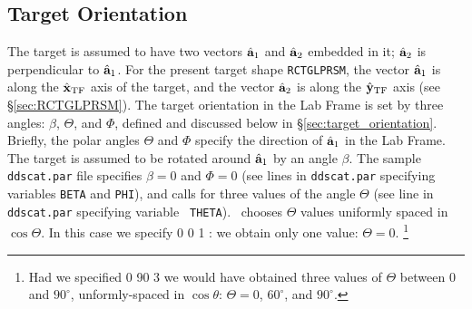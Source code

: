 

\subsection{\label{sec:target_orientation}
            Target Orientation}
The target is assumed to have two vectors ${\hat{\bf a}}_1$ and
${\hat{\bf a}}_2$ embedded in it; ${\hat{\bf a}}_2$ is perpendicular
to ${\hat{\bf a}}_1$.  
For the present target shape {\tt RCTGLPRSM},
the vector ${\hat{\bf
a}}_1$ is along the $\hat{\bf x}_{\rm TF}$ axis of the target, and the vector
${\hat{\bf a}}_2$ is along the $\hat{\bf y}_{\rm TF}$ axis (see \S\ref{sec:RCTGLPRSM}).
The target orientation in the Lab Frame is set by three angles: $\beta$,
$\Theta$, and $\Phi$, defined and discussed below in
\S\ref{sec:target_orientation}.  
Briefly, the polar angles $\Theta$
and $\Phi$ specify the direction of ${\hat{\bf a}}_1$ in the Lab
Frame.  The target is assumed to be rotated around ${\hat{\bf a}}_1$
by an angle $\beta$.  The sample {\tt ddscat.par} file specifies
$\beta=0$ and $\Phi=0$ (see lines in {\tt ddscat.par} specifying
variables {\tt BETA} and {\tt PHI}), and calls for three values of the
angle $\Theta$ (see line in {\tt ddscat.par} specifying variable {\tt
THETA}).  \ddscat\ chooses $\Theta$ values uniformly spaced
in $\cos\Theta$.  In this case we specify 0 0 1 : we obtain
only one value: $\Theta=0$.
\footnote{Had we specified 0 90 3 we would have obtained 
three values of $\Theta$ between 0
and $90^\circ$, unformly-spaced in $\cos\theta$: $\Theta=0$, $60^\circ$, and $90^\circ$.}

